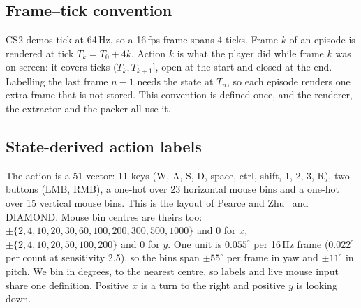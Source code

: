 \subsection{Frame--tick convention}
CS2 demos tick at 64\,Hz, so a 16\,fps frame spans $4$ ticks.
Frame $k$ of an episode is rendered at tick $T_k=T_0+4k$.
Action $k$ is what the player did while frame $k$ was on screen: it covers ticks $(T_k,T_{k+1}]$, open at the start and closed at the end.
Labelling the last frame $n-1$ needs the state at $T_n$, so each episode renders one extra frame that is not stored.
This convention is defined once, and the renderer, the extractor and the packer all use it.

\subsection{State-derived action labels}
The action is a 51-vector: 11 keys (W, A, S, D, space, ctrl, shift, 1, 2, 3, R), two buttons (LMB, RMB), a one-hot over 23 horizontal mouse bins and a one-hot over 15 vertical mouse bins.
This is the layout of Pearce and Zhu~\cite{pearce2021counterstrike} and DIAMOND.
Mouse bin centres are theirs too: $\pm\{2,4,10,20,30,60,100,200,300,500,1000\}$ and 0 for $x$, $\pm\{2,4,10,20,50,100,200\}$ and 0 for $y$.
One unit is $0.055^\circ$ per 16\,Hz frame ($0.022^\circ$ per count at sensitivity 2.5), so the bins span $\pm55^\circ$ per frame in yaw and $\pm11^\circ$ in pitch.
We bin in degrees, to the nearest centre, so labels and live mouse input share one definition.
Positive $x$ is a turn to the right and positive $y$ is looking down.

